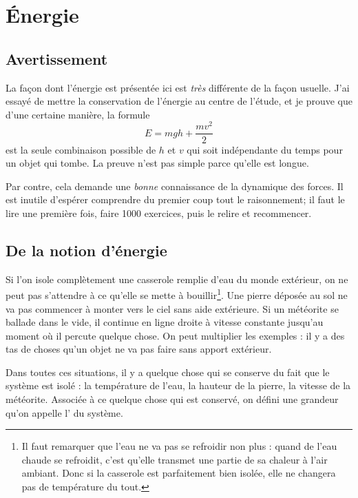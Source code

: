 

\section{Énergie} 

\subsection{Avertissement}

La façon dont l'énergie est présentée ici est \emph{très} différente de la façon usuelle. J'ai essayé de mettre la conservation de l'énergie au centre de l'étude, et je prouve que d'une certaine manière, la formule
\[ 
  E=mgh+\frac{ mv^2 }{ 2 }
\]
est la seule combinaison possible de $h$ et $v$ qui soit indépendante du temps pour un objet qui tombe. La preuve n'est pas simple parce qu'elle est longue. 

Par contre, cela demande une \emph{bonne} connaissance de la dynamique des forces. Il est inutile d'espérer comprendre du premier coup tout le raisonnement; il faut le lire une première fois, faire 1000 exercices, puis le relire et recommencer.

\subsection{De la notion d'énergie}

Si l'on isole complètement une casserole remplie d'eau du monde extérieur, on ne peut pas s'attendre à ce qu'elle se mette à bouillir\footnote{Il faut remarquer que l'eau ne va pas se refroidir non plus : quand de l'eau chaude se refroidit, c'est qu'elle transmet une partie de sa chaleur à l'air ambiant. Donc si la casserole est parfaitement bien isolée, elle ne changera pas de température du tout.}. Une pierre déposée au sol ne va pas commencer à monter vers le ciel sans aide extérieure. Si un météorite se ballade dans le vide, il continue en ligne droite à vitesse constante jusqu'au moment où il percute quelque chose. On peut multiplier les exemples : il y a des tas de choses qu'un objet ne va pas faire sans apport extérieur.

Dans toutes ces situations, il y a quelque chose qui se conserve du fait que le système est isolé : la température de l'eau, la hauteur de la pierre, la vitesse de la météorite. Associée à ce quelque chose qui est conservé, on défini une grandeur qu'on appelle l' du système.

